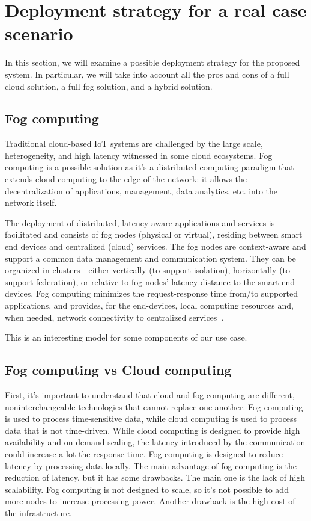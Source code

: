 \section{Deployment strategy for a real case scenario}
In this section, we will examine a possible deployment strategy for the proposed system. In particular, we will take into account all the pros and
cons of a full cloud solution, a full fog solution, and a hybrid solution.

\subsection{Fog computing}
Traditional cloud-based IoT systems are challenged by the large scale, heterogeneity, and high latency witnessed in some cloud ecosystems. Fog
computing is a possible solution as it's a distributed computing paradigm that extends cloud computing to the edge of the network: it allows the
decentralization of applications, management, data analytics, etc. into the network itself.

The deployment of distributed, latency-aware applications
and services is facilitated and consists of fog nodes (physical or virtual), residing between smart end devices and centralized (cloud) services. The
fog nodes are context-aware and support a common data management and communication system. They can be organized in clusters - either vertically (to
support isolation), horizontally (to support federation), or relative to fog nodes' latency distance to the smart end devices. Fog computing
minimizes the request-response time from/to supported applications, and provides, for the end-devices, local computing resources and, when needed,
network connectivity to centralized services~\cite{iorga2018fog}.

This is an interesting model for some components of our use case.

\subsection{Fog computing vs Cloud computing}
First, it's important to understand that cloud and fog computing are different, noninterchangeable technologies that cannot replace one another. Fog
computing is used to process time-sensitive data, while cloud computing is used to process data that is not time-driven. While cloud computing is
designed to provide high availability and on-demand scaling, the latency introduced by the communication could increase a lot the response time. Fog
computing is designed to reduce latency by processing data locally. The main advantage of fog computing is the reduction of latency, but it has some
drawbacks. The main one is the lack of high scalability. Fog computing is not designed to scale, so it's not possible to add more nodes to increase
processing power. Another drawback is the high cost of the infrastructure.

